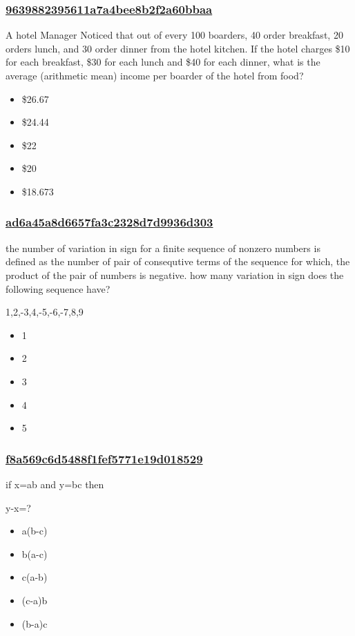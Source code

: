 \documentclass[]{beamer}
\begin{document}
\begin{frame}
    \frametitle{\underline{9639882395611a7a4bee8b2f2a60bbaa}}
    A hotel Manager Noticed that out of every 100 boarders, 40 order breakfast, 20 orders lunch, and 30 order dinner from the hotel kitchen. If the hotel charges \$10 for each breakfast, \$30 for each lunch and \$40 for each dinner, what is the average (arithmetic mean) income per boarder of the hotel from food?
    \begin{itemize}
        \item
            \$26.67
        \item
            \$24.44
        \item
            \$22
        \item
            \$20
        \item
            \$18.673
	\end{itemize}
\end{frame}


\begin{frame}
    \frametitle{\underline{ad6a45a8d6657fa3c2328d7d9936d303}}
    the number of variation in sign for a finite sequence of nonzero numbers is defined as the number of pair of consequtive terms of the sequence for which, the product of the pair of numbers is negative. how many variation in sign does the following sequence have? \par
1,2,-3,4,-5,-6,-7,8,9
    
    \begin{itemize}
        \item
            1
        \item
            2
        \item
            3
        \item
            4
        \item
            5
    \end{itemize}
\end{frame}

\begin{frame}
    \frametitle{\underline{f8a569c6d5488f1fef5771e19d018529}}
    if x=ab and y=bc then\par
y-x=?    
    \begin{itemize}
        \item
            a(b-c)
        \item
            b(a-c)
        \item
            c(a-b)
        \item
            (c-a)b
        \item
            (b-a)c
    \end{itemize}
\end{frame}
\end{document}
